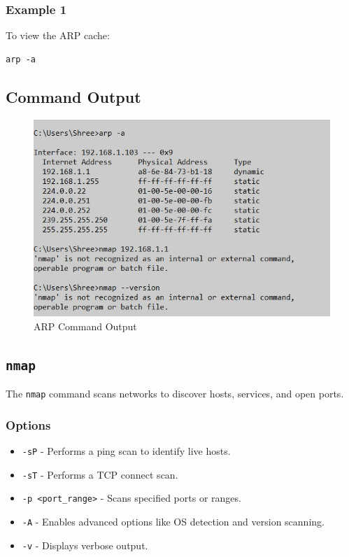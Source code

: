 \documentclass{article}
\begin{document}
\subsubsection{Example 1}
To view the ARP cache:
\begin{verbatim}
arp -a
\end{verbatim}

\subsection{Command Output}
\begin{figure}[htbp]
    \centering
    \includegraphics[]{arp.jpg}
    \caption{ARP Command Output}
    \label{fig:arp_output}
\end{figure}
\clearpage  %
\subsection{\texttt{nmap}}
The \texttt{nmap} command scans networks to discover hosts, services, and open ports.

\subsubsection{Options}
\begin{itemize}
    \item \texttt{-sP} - Performs a ping scan to identify live hosts.
    \item \texttt{-sT} - Performs a TCP connect scan.
    \item \texttt{-p \textless port\_range\textgreater} - Scans specified ports or ranges.
    \item \texttt{-A} - Enables advanced options like OS detection and version scanning.
    \item \texttt{-v} - Displays verbose output.
\end{itemize}
\end{document}
